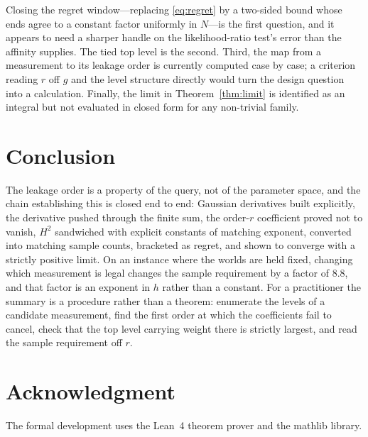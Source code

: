 \documentclass[conference]{IEEEtran}
\theoremstyle{definition}
\begin{document}
Closing the regret window---replacing \eqref{eq:regret} by a two-sided bound whose ends agree
to a constant factor uniformly in $N$---is the first question, and it appears to need a
sharper handle on the likelihood-ratio test's error than the affinity supplies. The tied top
level is the second. Third, the map from a measurement to its leakage order is currently
computed case by case; a criterion reading $r$ off $g$ and the level structure directly would
turn the design question into a calculation. Finally, the limit in
Theorem~\ref{thm:limit} is identified as an integral but not evaluated in closed form for any
non-trivial family.

\section{Conclusion}

The leakage order is a property of the query, not of the parameter space, and the chain
establishing this is closed end to end: Gaussian derivatives built explicitly, the derivative
pushed through the finite sum, the order-$r$ coefficient proved not to vanish, $H^{2}$
sandwiched with explicit constants of matching exponent, converted into matching sample
counts, bracketed as regret, and shown to converge with a strictly positive limit. On an
instance where the worlds are held fixed, changing which measurement is legal changes the
sample requirement by a factor of $8.8$, and that factor is an exponent in $h$ rather than a
constant. For a practitioner the summary is a procedure rather than a theorem: enumerate the
levels of a candidate measurement, find the first order at which the coefficients fail to
cancel, check that the top level carrying weight there is strictly largest, and read the
sample requirement off $r$.

\section*{Acknowledgment}

The formal development uses the Lean~4 theorem prover and the mathlib library.
\end{document}
